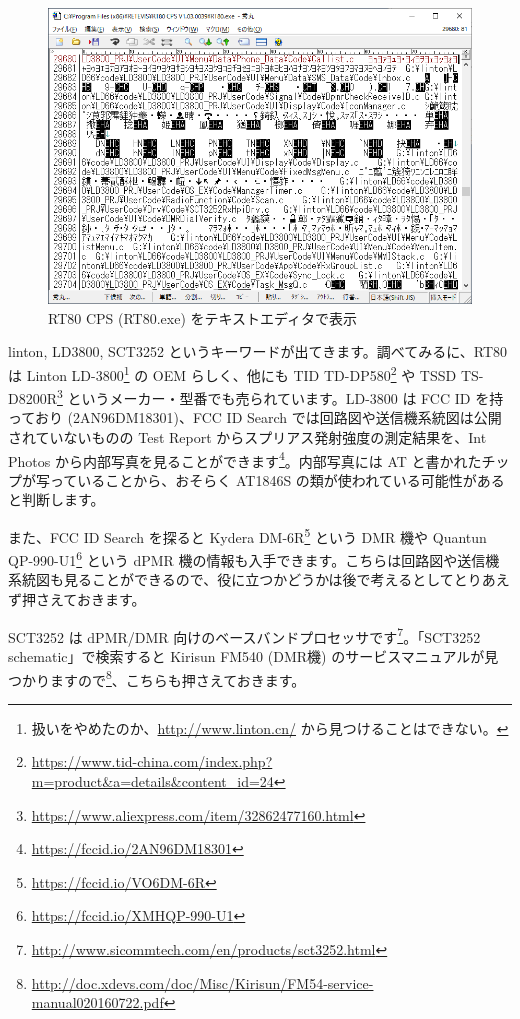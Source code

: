 \documentclass[a4j,oneside]{ujbook}
\begin{document}
\begin{figure}[H]
 \centering
 \includegraphics[width=15cm]{img/rt80-cps.png}
 \caption{RT80 CPS (RT80.exe) をテキストエディタで表示}
\end{figure}

linton, LD3800, SCT3252 というキーワードが出てきます。調べてみるに、RT80 は Linton LD-3800\footnote{扱いをやめたのか、\url{http://www.linton.cn/} から見つけることはできない。} の OEM らしく、他にも TID TD-DP580\footnote{\url{https://www.tid-china.com/index.php?m=product&a=details&content_id=24}} や TSSD TS-D8200R\footnote{\url{https://www.aliexpress.com/item/32862477160.html}} というメーカー・型番でも売られています。LD-3800 は FCC ID を持っており (2AN96DM18301)、FCC ID Search では回路図や送信機系統図は公開されていないものの Test Report からスプリアス発射強度の測定結果を、Int Photos から内部写真を見ることができます\footnote{\url{https://fccid.io/2AN96DM18301}}。内部写真には AT と書かれたチップが写っていることから、おそらく AT1846S の類が使われている可能性があると判断します。

また、FCC ID Search を探ると Kydera DM-6R\footnote{\url{https://fccid.io/VO6DM-6R}} という DMR 機や Quantun QP-990-U1\footnote{\url{https://fccid.io/XMHQP-990-U1}} という dPMR 機の情報も入手できます。こちらは回路図や送信機系統図も見ることができるので、役に立つかどうかは後で考えるとしてとりあえず押さえておきます。

SCT3252 は dPMR/DMR 向けのベースバンドプロセッサです\footnote{\url{http://www.sicommtech.com/en/products/sct3252.html}}。「SCT3252 schematic」で検索すると Kirisun FM540 (DMR機) のサービスマニュアルが見つかりますので\footnote{\url{http://doc.xdevs.com/doc/Misc/Kirisun/FM54-service-manual020160722.pdf}}、こちらも押さえておきます。
\end{document}
